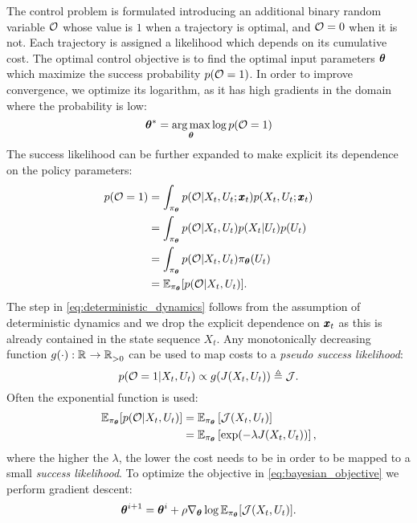 The control problem is formulated introducing an additional binary random variable $\mathcal{O}$ whose value is $1$ when a trajectory is optimal, and $\mathcal{O} = 0$ when it is not. Each trajectory is assigned a likelihood which depends on its cumulative cost. The optimal control objective is to find the optimal input parameters $\boldsymbol{\theta}$ which maximize the success probability $p(\mathcal{O} = 1)$. In order to improve convergence, we optimize its logarithm, as it has high gradients in the domain where the probability is low: 
\begin{equation} \label{eq:bayesian_objective}
    \boldsymbol{\theta}^* = \underset{\boldsymbol{\theta}}{\arg\max} \log p(\mathcal{O} = 1)
\end{equation}
The success likelihood can be further expanded to make explicit its dependence on the policy parameters:
\begin{align}
        p(\mathcal{O} = 1)
        &= \int_{\pi_{\boldsymbol{\theta}}} p(\mathcal{O} | X_t, U_t; \pmb{x}_t) p(X_t, U_t; \pmb{x}_t) \\
        &= \int_{\pi_{\boldsymbol{\theta}}}p(\mathcal{O} | X_t, U_t) p(X_t| U_t) p(U_t) \label{eq:deterministic_dynamics}\\
        &= \int_{\pi_{\boldsymbol{\theta}}}p(\mathcal{O} | X_t, U_t) \pi_{\boldsymbol{\theta}}(U_t) \\
        &= \mathbb{E}_{\pi_{\boldsymbol{\theta}}} [p(\mathcal{O} | X_t, U_t)].
        \label{eq:input_to_params}
\end{align}
The step in \eqref{eq:deterministic_dynamics} follows from the assumption of deterministic dynamics and we drop the explicit dependence on $\pmb{x}_t$ as this is already contained in the state sequence $X_t$. Any monotonically decreasing function $g(\cdot): \mathbb{R}^{} \rightarrow \mathbb{R}^{}_{>0}$ can be used to map costs to a \textit{pseudo success likelihood}:
\begin{equation}
p(\mathcal{O} = 1| X_t, U_t) \propto g(J(X_t, U_t)) \triangleq \mathcal{J}.
\end{equation}
Often the exponential function is used:
\begin{align}
    \mathbb{E}_{\pi_{\boldsymbol{\theta}}} [p(\mathcal{O} | X_t, U_t)]  
    &= \mathbb{E}_{\pi_{\boldsymbol{\theta}}} \left[ \mathcal{J}(X_t, U_t) \right] \\
    &= \mathbb{E}_{\pi_{\boldsymbol{\theta}}} \left[ \exp (-\lambda J(X_t, U_t)) \right],
\end{align}
where the higher the $\lambda$, the lower the cost needs to be in order to be mapped to a small \textit{success likelihood}. To optimize the objective in \eqref{eq:bayesian_objective} we perform gradient descent:
\begin{equation}
    \boldsymbol{\theta}^{i+1} 
    = \boldsymbol{\theta}^i + \rho \nabla_{ \boldsymbol{\theta}}\log \mathbb{E}_{\pi_{\boldsymbol{\theta}}} [\mathcal{J}(X_t, U_t)].
\end{equation}

